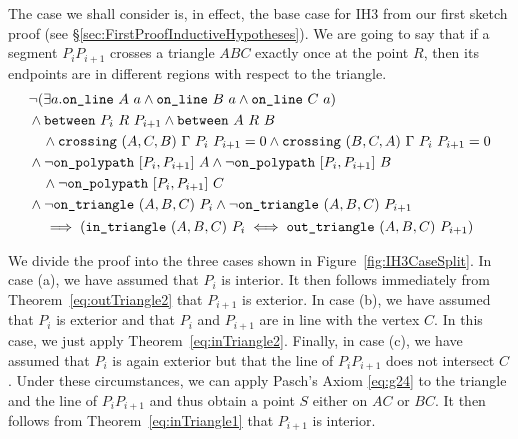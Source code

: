 The case we shall consider is, in effect, the base case for IH3 from our first sketch proof (see \S\ref{sec:FirstProofInductiveHypotheses}). We are going to say that if a segment $P_iP_{i+1}$ crosses a triangle $ABC$ exactly once at the point $R$, then its endpoints are in different regions with respect to the triangle. 
\begin{multline}\label{eq:IH3}
  \begin{aligned}
    &\neg(\exists a.\texttt{on\_line}\ A\ a\wedge \texttt{on\_line}\ B\ a\wedge \texttt{on\_line}\ C\ a)\\
    &\wedge\texttt{between}\ P_i\ R\ P_{i+1} \wedge \texttt{between}\ A\ R\ B \\
    &\quad\wedge\texttt{crossing}\ (A,C,B)\ \Gamma\ P_i\ P_{i+1} = 0\wedge\texttt{crossing}\ (B,C,A)\ \Gamma\ P_i\ P_{i+1} = 0\\
    &\wedge\neg\texttt{on\_polypath}\ [P_i,P_{i+1}]\ A \wedge \neg\texttt{on\_polypath}\ [P_i,P_{i+1}]\ B \\
    &\quad\wedge \neg\texttt{on\_polypath}\ [P_i,P_{i+1}]\ C\\
    &\wedge\neg\texttt{on\_triangle}\ (A,B,C)\ P_i \wedge\neg\texttt{on\_triangle}\ (A,B,C)\ P_{i+1}
  \end{aligned}\\
  \implies\left(\texttt{in\_triangle}\ (A,B,C)\ P_i \iff \texttt{out\_triangle}\ (A,B,C)\ P_{i+1}\right)
\end{multline}

We divide the proof into the three cases shown in Figure~\ref{fig:IH3CaseSplit}. In case (a), we have assumed that $P_i$ is interior. It then follows immediately from Theorem~\ref{eq:outTriangle2} that $P_{i+1}$ is exterior. In case (b), we have assumed that $P_i$ is exterior and that $P_i$ and $P_{i+1}$ are in line with the vertex $C$. In this case, we just apply Theorem~\ref{eq:inTriangle2}. Finally, in case (c), we have assumed that $P_i$ is again exterior but that the line of $P_iP_{i+1}$ does not intersect $C$. Under these circumstances, we can apply Pasch's Axiom \eqref{eq:g24} to the triangle and the line of $P_iP_{i+1}$ and thus obtain a point $S$ either on $AC$ or $BC$. It then follows from Theorem~\ref{eq:inTriangle1} that $P_{i+1}$ is interior.

